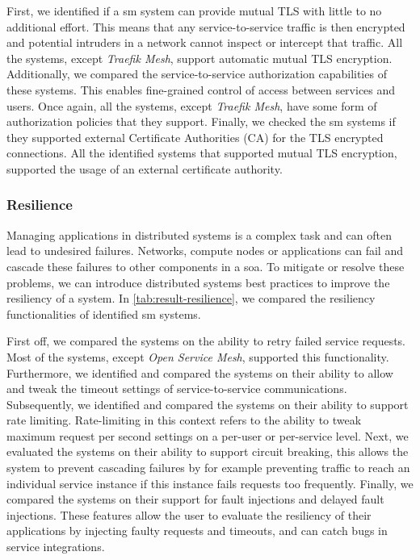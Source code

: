 First, we identified if a \gls{sm} system can provide mutual TLS with little to no additional effort. This means that any service-to-service traffic is then encrypted and potential intruders in a network cannot inspect or intercept that traffic. All the systems, except \textit{Traefik Mesh}, support automatic mutual TLS encryption. Additionally, we compared the service-to-service authorization capabilities of these systems. This enables fine-grained control of access between services and users. Once again, all the systems, except \textit{Traefik Mesh}, have some form of authorization policies that they support. Finally, we checked the \gls{sm} systems if they supported external Certificate Authorities (CA) for the TLS encrypted connections. All the identified systems that supported mutual TLS encryption, supported the usage of an external certificate authority.

\subsubsection{Resilience}
\label{sec:survey:results:comparison:resilience}




Managing applications in distributed systems is a complex task and can often lead to undesired failures. Networks, compute nodes or applications can fail and cascade these failures to other components in a \gls{soa}. To mitigate or resolve these problems, we can introduce distributed systems best practices to improve the resiliency of a system. In \cref{tab:result-resilience}, we compared the resiliency functionalities of identified \gls{sm} systems. 

First off, we compared the systems on the ability to retry failed service requests. Most of the systems, except \textit{Open Service Mesh}, supported this functionality. Furthermore, we identified and compared the systems on their ability to allow and tweak the timeout settings of service-to-service communications. Subsequently, we identified and compared the systems on their ability to support rate limiting. Rate-limiting in this context refers to the ability to tweak maximum request per second settings on a per-user or per-service level. Next, we evaluated the systems on their ability to support circuit breaking, this allows the system to prevent cascading failures by for example preventing traffic to reach an individual service instance if this instance fails requests too frequently. Finally, we compared the systems on their support for fault injections and delayed fault injections. These features allow the user to evaluate the resiliency of their applications by injecting faulty requests and timeouts, and can catch bugs in service integrations.


